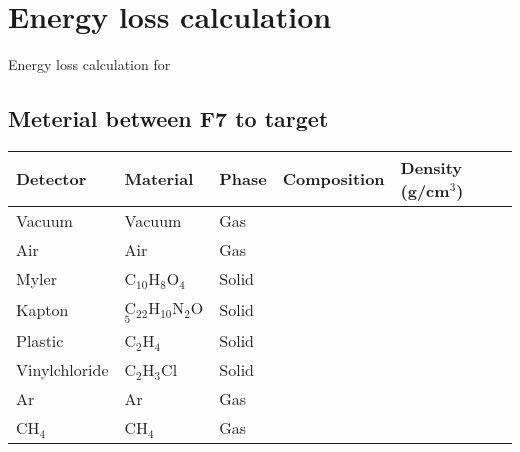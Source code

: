 \chapter{Energy loss calculation}
Energy loss calculation for \cite{Dayonewiki} \cite{Ogoshi}
\section{Meterial between F7 to target}
\begin{table}
    \centering
    \begin{tabular}{lllll}
    Detector & Material & Phase & Composition & Density (g/cm$^3$) \\
    \hline
    Vacuum & Vacuum & Gas &  &  \\
    Air & Air & Gas &  &  \\
    Myler & C$_{10}$H$_8$O$_4$ & Solid &  &  \\
    Kapton & C$_{22}$H$_{10}$N$_2$O$_5$ & Solid &  &  \\
    Plastic & C$_2$H$_4$ & Solid &  &  \\
    Vinylchloride & C$_2$H$_3$Cl & Solid &  &  \\
    Ar & Ar & Gas &  &  \\
    CH$_4$ & CH$_4$ & Gas &  &  \\
    
    \end{tabular}
\end{table}
